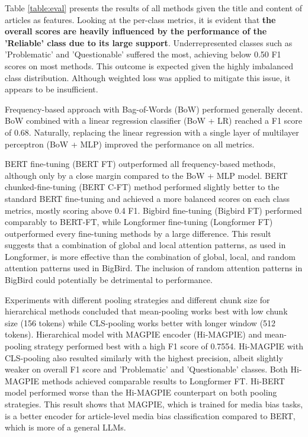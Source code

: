 Table \ref{table:eval} presents the results of all methods given the title and content of articles as features. Looking at the per-class metrics, it is evident that \textbf{the overall scores are heavily influenced by the performance of the 'Reliable' class due to its large support}. Underrepresented classes such as 'Problematic' and 'Questionable' suffered the most, achieving below 0.50 F1 scores on most methods. This outcome is expected given the highly imbalanced class distribution. Although weighted loss was applied to mitigate this issue, it appears to be insufficient.

Frequency-based approach with Bag-of-Words (BoW) performed generally decent. BoW combined with a linear regression classifier (BoW + LR) reached a F1 score of 0.68.  Naturally, replacing the linear regression with a single layer of multilayer perceptron (BoW + MLP) improved the performance on all metrics.

BERT fine-tuning (BERT FT) outperformed all frequency-based methods, although only by a close margin compared to the BoW + MLP model. BERT chunked-fine-tuning (BERT C-FT) method performed slightly better to the standard BERT fine-tuning and achieved a more balanced scores on each class metrics, mostly scoring above 0.4 F1. Bigbird fine-tuning (Bigbird FT) performed comparably to BERT-FT, while Longformer fine-tuning (Longformer FT) outperformed every fine-tuning methods by a large difference. This result suggests that a combination of global and local attention patterns, as used in Longformer, is more effective than the combination of global, local, and random attention patterns used in BigBird. The inclusion of random attention patterns in BigBird could potentially be detrimental to performance.

Experiments with different pooling strategies and different chunk size for hierarchical methods concluded that mean-pooling works best with low chunk size (156 tokens) while CLS-pooling works better with longer window (512 tokens). Hierarchical model with MAGPIE encoder (Hi-MAGPIE) and mean-pooling strategy performed best with a high F1 score of 0.7554. Hi-MAGPIE with CLS-pooling also resulted similarly with the highest precision, albeit slightly weaker on overall F1 score and 'Problematic' and 'Questionable' classes. Both Hi-MAGPIE methods achieved comparable results to Longformer FT. Hi-BERT model performed worse than the Hi-MAGPIE counterpart on both pooling strategies. This result shows that MAGPIE, which is trained for media bias tasks, is a better encoder for article-level media bias classification compared to BERT, which is more of a general LLMs.

